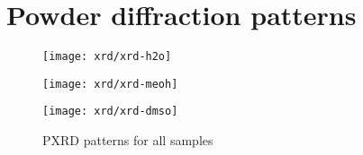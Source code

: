 
\FloatBarrier%
\section{Powder diffraction patterns}\label{appx:def:xrd}

\begin{figure}
    \centering

    \texttt{[image: xrd/xrd-h2o]}

    \texttt{[image: xrd/xrd-meoh]}

    \texttt{[image: xrd/xrd-dmso]}

    \caption{PXRD patterns for all samples}%
    \label{appx:def:fgr:xrd}
\end{figure}